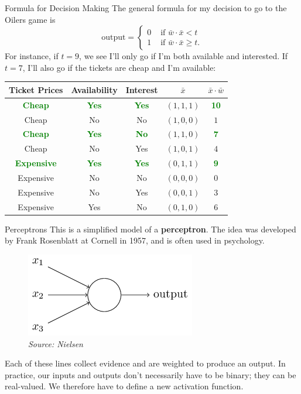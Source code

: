 \documentclass[xcolor=dvipsnames, fontsize=11pt, %
pagesize, %
parskip=half-, t]{beamer}
\begin{document}
\begin{frame}{Formula for Decision Making}
The general formula for my decision to go to the Oilers game is $$\text{output}=\begin{cases} 0 & \text{ if } \bar{w}\cdot \bar{x}<t \\ 
1 & \text{ if } \bar{w}\cdot \bar{x}\ge t. \end{cases}$$ \pause 
For instance, if $t=9$, we see I'll only go if I'm both available and interested. \pause If $t=7$, I'll also go if the tickets are cheap and I'm available:
\begin{table} 
\center 
\begin{tabular}{cccc|c}
Ticket Prices & Availability & Interest & $\bar{x}$ & $\bar{x}\cdot \bar{w}$ \\ \hline 
\textbf{\textcolor{Green}{Cheap}} & \textbf{\textcolor{Green}{Yes}} & \textbf{\textcolor{Green}{Yes}} & $(1,1,1)$ & \textbf{\textcolor{Green}{10}} \\
Cheap & No & No & $(1,0,0)$ & $1$ \\
\textbf{\textcolor{Green}{Cheap }}& \textbf{\textcolor{Green}{Yes }}& \textbf{\textcolor{Green}{No}} & $(1,1,0)$ & \textbf{\textcolor{Green}{7}} \\
Cheap & No & Yes & $(1,0,1)$ & $4$   \\
\textbf{\textcolor{Green}{Expensive}} & \textbf{\textcolor{Green}{Yes}} & \textbf{\textcolor{Green}{Yes}} & $(0,1,1)$ & \textbf{\textcolor{Green}{9}} \\
Expensive & No & No & $(0,0,0)$  & $0$ \\
Expensive & No & Yes & $(0,0,1)$ & $3$\\
Expensive & Yes & No & $(0,1,0)$ & $6$
\end{tabular}
\end{table}
\end{frame}
\begin{frame}{Perceptrons}
This is a simplified model of a \textbf{perceptron}. The idea was developed by Frank Rosenblatt at Cornell in 1957, and is often used in psychology. \pause 

\begin{figure}
\center
\includegraphics[scale=0.66]{perc.png}
\caption{\textit{Source: Nielsen}}
\end{figure} \pause
\vspace{0.05\textheight} 
Each of these lines collect evidence and are weighted to produce an output. \pause In practice, our inputs and outputs don't necessarily have to be binary; they can be real-valued. We therefore have to define a new activation function.
\end{frame}
\end{document}
